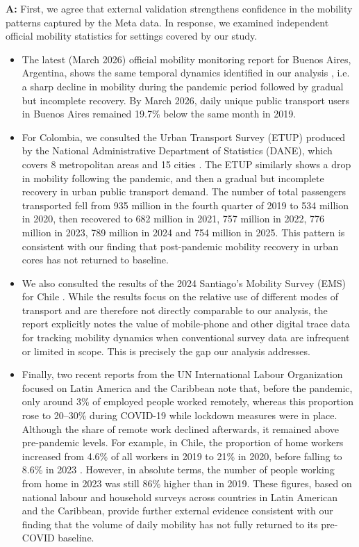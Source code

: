 \documentclass[12pt,a4paper,oneside, reqno]{amsart}
\begin{document}
\setlength{\leftskip}{1cm}\textbf{A:} First, we agree that external validation strengthens confidence in the mobility patterns captured by the Meta data. In response, we examined independent official mobility statistics for settings covered by our study.
\begin{itemize}[noitemsep, topsep=0pt]
\item The latest (March 2026) official mobility monitoring report for Buenos Aires, Argentina, shows the same temporal dynamics identified in our analysis \parencite{OMSV2026BA}, i.e. a sharp decline in mobility during the pandemic period followed by gradual but incomplete recovery. By March 2026, daily unique public transport users in Buenos Aires remained 19.7\% below the same month in 2019.
\item For Colombia, we consulted the Urban Transport Survey (ETUP) produced by the National Administrative Department of Statistics (DANE), which covers 8 metropolitan areas and 15 cities \parencite{DANE2025}. The ETUP similarly shows a drop in mobility following the pandemic, and then a gradual but incomplete recovery in urban public transport demand. The number of total passengers transported fell from 935 million in the fourth quarter of 2019 to 534 million in 2020, then recovered to 682 million in 2021, 757 million in 2022, 776 million in 2023, 789 million in 2024 and 754 million in 2025. This pattern is consistent with our finding that post-pandemic mobility recovery in urban cores has not returned to baseline. 
\item We also consulted the results of the 2024 Santiago's Mobility Survey (EMS) for Chile \parencite{Hurtubia2024EMS}. While the results focus on the relative use of different modes of transport and are therefore not directly comparable to our analysis, the report explicitly notes the value of mobile-phone and other digital trace data for tracking mobility dynamics when conventional survey data are infrequent or limited in scope. This is precisely the gap our analysis addresses.
\item Finally, two recent reports from the UN International Labour Organization focused on Latin America and the Caribbean \parencite{ILO2023PanoramaLaboral, BertranouGontero2024LACWork} note that, before the pandemic, only around 3\% of employed people worked remotely, whereas this proportion rose to 20--30\% during COVID-19 while lockdown measures were in place. Although the share of remote work declined afterwards, it remained above pre-pandemic levels. For example, in Chile, the proportion of home workers increased from 4.6\% of all workers in 2019 to 21\% in 2020, before falling to 8.6\% in 2023 \parencite{ILO2023PanoramaLaboral}. However, in absolute terms, the number of people working from home in 2023 was still 86\% higher than in 2019. These figures, based on national labour and household surveys across countries in Latin American and the Caribbean, provide further external evidence consistent with our finding that the volume of daily mobility has not fully returned to its pre-COVID baseline.
\end{itemize}
\end{document}
